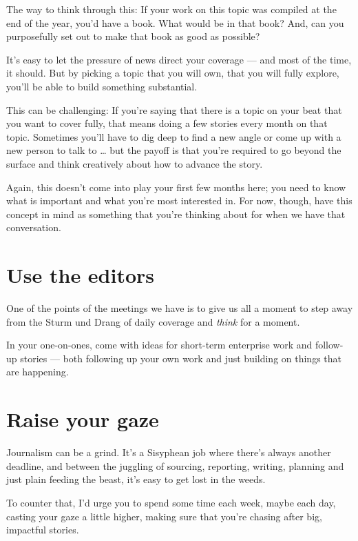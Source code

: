 \documentclass[
  11pt,
  american,
  letterpaperpaper,
  extrafontsizes,onecolumn,openright
  ]{memoir}
\newlength{\rf}
\begin{document}
The way to think through this: If your work on this topic was compiled at the end of the year, you'd have a book. What would be in that book? And, can you purposefully set out to make that book as good as possible?

It's easy to let the pressure of news direct your coverage --- and most of the time, it should. But by picking a topic that you will own, that you will fully explore, you'll be able to build something substantial.

This can be challenging: If you're saying that there is a topic on your beat that you want to cover fully, that means doing a few stories every month on that topic. Sometimes you'll have to dig deep to find a new angle or come up with a new person to talk to \ldots{} but the payoff is that you're required to go beyond the surface and think creatively about how to advance the story.

Again, this doesn't come into play your first few months here; you need to know what is important and what you're most interested in. For now, though, have this concept in mind as something that you're thinking about for when we have that conversation.

\hypertarget{use-the-editors-1}{%
\section*{Use the editors}\label{use-the-editors-1}}

One of the points of the meetings we have is to give us all a moment to step away from the Sturm und Drang of daily coverage and \emph{think} for a moment.

In your one-on-ones, come with ideas for short-term enterprise work and follow-up stories --- both following up your own work and just building on things that are happening.

\hypertarget{raise-your-gaze}{%
\section*{Raise your gaze}\label{raise-your-gaze}}

Journalism can be a grind. It's a Sisyphean job where there's always another deadline, and between the juggling of sourcing, reporting, writing, planning and just plain feeding the beast, it's easy to get lost in the weeds.

To counter that, I'd urge you to spend some time each week, maybe each day, casting your gaze a little higher, making sure that you're chasing after big, impactful stories.
\end{document}
